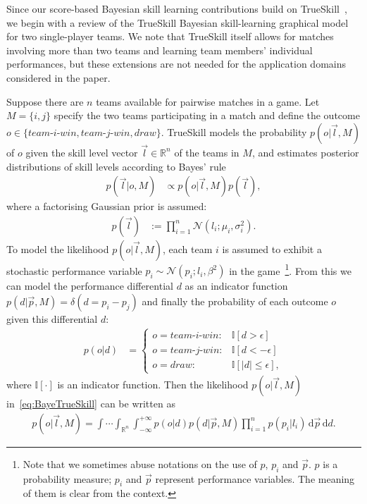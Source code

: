 Since our score-based Bayesian skill learning contributions build on
TrueSkill~\cite{herbrich06569}, we begin with a review of the
TrueSkill Bayesian skill-learning graphical model for two
single-player teams.  We note that TrueSkill itself allows for matches
involving more than two teams and learning team members' individual
performances, but these extensions are not needed for the application
domains considered in the paper.

Suppose there are $n$ teams available for pairwise matches in a
game.  Let $M=\{i,j\}$ specify the two teams participating in a match
and define the outcome $o \in \{ \textit{team-i-win},
\textit{team-j-win}, \textit{draw} \}$.  TrueSkill models the
probability $p(o|\vec{l},M)$ of $o$ given the skill
level vector $\vec{l} \in \mathbb{R}^n$
of the teams in $M$,
and estimates
posterior distributions of skill levels according to Bayes' rule
\begin{align}
    p(\vec{l}|o,M) & \propto p(o|\vec{l},M) p(\vec{l}),
\label{eq:BayeTrueSkill}
\end{align}
where a factorising Gaussian prior is assumed:
\begin{align}
    p(\vec{l}) & :=\prod_{i=1}^{n}\mathcal{N}(l_i;\mu_i,\sigma_i^2).
\end{align}
To model the likelihood $p(o|\vec{l},M)$,
each team $i$ is assumed to exhibit a stochastic performance variable $p_i \sim
\mathcal{N}(p_i;l_i,\beta^2)$ in the game~\footnote{\noindent Note that we sometimes abuse notations on the use of $p$, $p_i$ and $\vec{p}$. $p$ is a probability measure; $p_i$ and $\vec{p}$ represent performance variables. The meaning of them is clear from the context.}. From this we can model
the performance differential $d$ as an indicator function $p(d|\vec{p},M) = \delta(d = p_i - p_j)$
and finally the probability of each outcome $o$ given this
differential $d$:
\begin{align}
p(o|d) & =
\begin{cases}
o = \textit{team-i-win}: & \mathbb{I}[d > \epsilon]\\
o = \textit{team-j-win}: & \mathbb{I}[d < -\epsilon]\\
o = \textit{draw}:       & \mathbb{I}[|d| \leq \epsilon],
\end{cases}
\end{align}
where $\mathbb{I}[\cdot]$ is an indicator function. Then the likelihood $p(o|\vec{l},M)$ in~\eqref{eq:BayeTrueSkill}
can be written as
\begin{align*} %
p(o|\vec{l},M) = \int \cdots \int_{\mathbb{R}^n} \int_{-\infty}^{+\infty} p(o|d) p(d|\vec{p},M) \prod_{i=1}^n p(p_i|l_i) \, \mathrm{d}\vec{p} \, \mathrm{d}d.
\end{align*}
